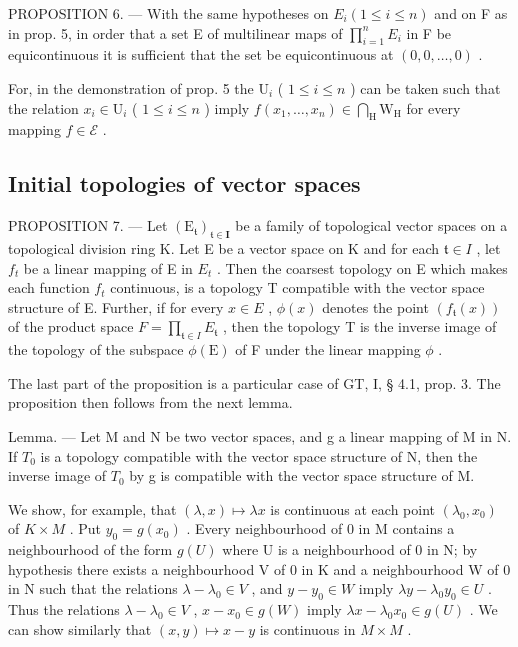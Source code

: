 PROPOSITION 6. --- With the same hypotheses on \(E_{i}(1 \leqslant i \leqslant n)\) and on F as in prop. 5, in order that a set E of multilinear maps of \(\prod_{i=1}^{n} E_{i}\) in F be equicontinuous it is sufficient that the set be equicontinuous at \((0, 0, \ldots, 0)\) .

For, in the demonstration of prop. 5 the \(\mathrm{U}_i\) ( \(1 \leqslant i \leqslant n\) ) can be taken such that the relation \(x_i \in \mathrm{U}_i\) ( \(1 \leqslant i \leqslant n\) ) imply \(f(x_1, \ldots, x_n) \in \bigcap_{\mathrm{H}} \mathrm{W}_{\mathrm{H}}\) for every mapping \(f \in \mathcal{E}\) .

\subsection{Initial topologies of vector spaces}

PROPOSITION 7. --- Let \((\mathrm{E}_{\mathfrak{t}})_{\mathfrak{t}\in\mathbf{I}}\) be a family of topological vector spaces on a topological division ring K. Let E be a vector space on K and for each \(\mathfrak{t}\in I\) , let \(f_{t}\) be a linear mapping of E in \(E_{t}\) . Then the coarsest topology on E which makes each function \(f_{t}\) continuous, is a topology T compatible with the vector space structure of E. Further, if for every \(x\in E\) , \(\phi(x)\) denotes the point \((f_{\mathfrak{t}}(x))\) of the product space \(F=\prod_{\mathfrak{t}\in I}E_{\mathfrak{t}}\) , then the topology T is the inverse image of the topology of the subspace \(\phi(\mathrm{E})\) of F under the linear mapping \(\phi\) .

The last part of the proposition is a particular case of GT, I, § 4.1, prop. 3. The proposition then follows from the next lemma.

Lemma. --- Let M and N be two vector spaces, and g a linear mapping of M in N. If \(T_{0}\) is a topology compatible with the vector space structure of N, then the inverse image of \(T_{0}\) by g is compatible with the vector space structure of M.

We show, for example, that \((\lambda, x) \mapsto \lambda x\) is continuous at each point \((\lambda_{0}, x_{0})\) of \(K \times M\) . Put \(y_{0} = g(x_{0})\) . Every neighbourhood of 0 in M contains a neighbourhood of the form \(g(U)\) where U is a neighbourhood of 0 in N; by hypothesis there exists a neighbourhood V of 0 in K and a neighbourhood W of 0 in N such that the relations \(\lambda - \lambda_{0} \in V\) , and \(y - y_{0} \in W\) imply \(\lambda y - \lambda_{0}y_{0} \in U\) . Thus the relations \(\lambda - \lambda_{0} \in V\) , \(x - x_{0} \in g(W)\) imply \(\lambda x - \lambda_{0}x_{0} \in g(U)\) . We can show similarly that \((x, y) \mapsto x - y\) is continuous in \(M \times M\) .


